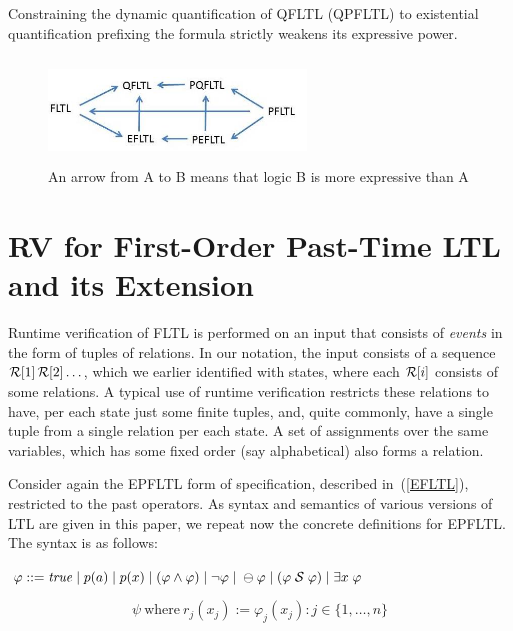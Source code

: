 \begin{corollary}
Constraining the dynamic quantification of QFLTL (QPFLTL) to existential quantification prefixing the
formula strictly weakens its expressive power.
\end{corollary}



\begin{figure}
\begin{center}
\includegraphics[height=1.1in,width=2.7in]{FIRST.jpg}
\caption{\label{fsfr} An arrow from A to B means that logic  B is more expressive than A}
\end{center}
\end{figure}


\section{RV for First-Order Past-Time LTL and its Extension}
\label{EPLTLRV}

Runtime verification of FLTL is performed on an
input that consists of {\em events} in the form of
tuples of relations. In our notation, the input
consists of a sequence ${\cal R}[1] \, {\cal R}[2]  \ldots$,
which we earlier identified with states, where each
${\cal R}[i]$ consists of some relations. A typical use
of runtime verification restricts these relations to have,
per each state just some finite tuples, and, quite commonly, have a single tuple from a single relation per each state.
A set of assignments over the same variables, which has some fixed order
(say alphabetical) also forms a relation.

Consider again the EPFLTL form
of specification, described in~(\ref{EFLTL}), restricted to the past operators. As syntax and semantics of various versions
of LTL are given in this paper, we repeat now the concrete definitions for EPFLTL. The syntax is as follows:


\begin{center}
$\varphi ::= \mathit{true}  \; | \;
    p ( a ) \; | \;
    p ( x ) \; | \;
    ( \varphi \wedge \varphi ) \;  |   \;
   \neg \varphi \; | \;
    \ominus \varphi \; | \;
    ( \varphi  \; {\cal S}  \; \varphi ) \; | \;
    \exists x \; \varphi$
\end{center}
\[ 
\psi \mathrm{\ where\ } r_j ( x_j) := 
\varphi_j (x_j) : j \in \{ 1 , \ldots , n \}
\]



